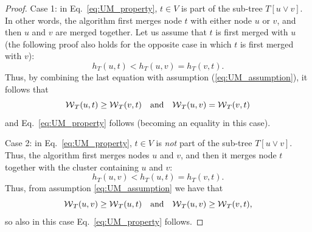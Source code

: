 \begin{proof}
Case 1: in Eq.~\ref{eq:UM_property}, $t\in V$ is part of the sub-tree ${T[u \vee v]}$. In other words, the algorithm first merges node $t$ with either node $u$ or $v$, and then $u$ and $v$ are merged together. Let us assume that $t$ is first merged with $u$ (the following proof also holds for the opposite case in which $t$ is first merged with $v$):
\begin{equation}\label{eq:case_1}
h_T(u, t) < h_T(u, v) = h_T(v, t).
\end{equation}
Thus, by combining the last equation with assumption (\ref{eq:UM_assumption}), it follows that
\begin{equation}
\mathcal{W}{}_{T}(u, t) \geq \mathcal{W}{}_{T}(v, t) \quad  \text{and} \quad \mathcal{W}{}_{T}(u, v) = \mathcal{W}{}_{T}(v, t)
\end{equation}
and Eq.~\ref{eq:UM_property} follows (becoming an equality in this case).

Case 2: in Eq.~\ref{eq:UM_property}, $t\in V$ is \emph{not} part of the sub-tree ${T[u \vee v]}$. Thus, the algorithm first merges nodes $u$ and $v$, and then it merges node $t$ together with the cluster containing $u$ and $v$:
\begin{equation}
h_T(u, v) < h_T(u, t) = h_T(v, t).
\end{equation}
Thus, from assumption \ref{eq:UM_assumption} we have that
\begin{equation}
\mathcal{W}{}_{T}(u, v) \geq \mathcal{W}{}_{T}(u, t) \quad  \text{and} \quad \mathcal{W}{}_{T}(u, v) \geq \mathcal{W}{}_{T}(v, t),
\end{equation}
so also in this case Eq.~\ref{eq:UM_property} follows.


\end{proof}

